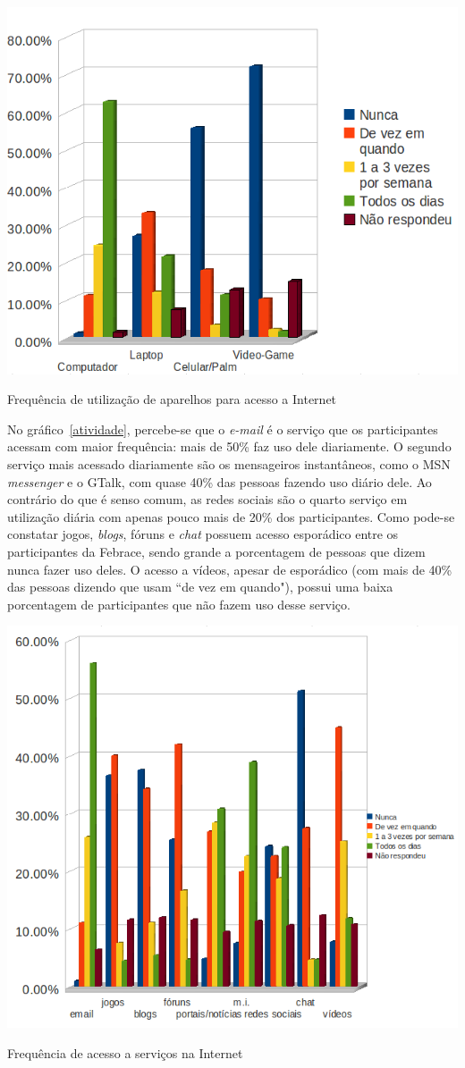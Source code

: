     \begin{grafico}
        \begin{center}
    \includegraphics[width=0.7\linewidth]{arquivos/dispositivo.png}
        \end{center}
        \caption{Frequência de utilização de aparelhos para acesso a Internet}
        \label{dispositivo}
    \end{grafico}

    No gráfico~\ref{atividade}, percebe-se que o \textit{e-mail} é o serviço que os participantes acessam com maior frequência: mais de 50\% faz uso dele diariamente. O segundo serviço mais acessado diariamente são os mensageiros instantâneos, como o MSN \textit{messenger} e o GTalk, com quase 40\%  das pessoas fazendo uso diário dele. Ao contrário do que é senso comum, as redes sociais são o quarto serviço em utilização diária com apenas pouco mais de 20\% dos participantes. Como pode-se constatar jogos, \textit{blogs}, fóruns e \textit{chat} possuem acesso esporádico entre os participantes da Febrace, sendo grande a porcentagem de pessoas que dizem nunca fazer uso deles. O acesso a vídeos, apesar de esporádico (com mais de 40\% das pessoas dizendo que usam “de vez em quando"), possui uma baixa porcentagem de participantes que não fazem uso desse serviço.

    \begin{grafico}
        \begin{center}
    \includegraphics[width=0.7\linewidth]{arquivos/atividade.png}
        \end{center}
        \caption{Frequência de acesso a serviços na Internet}
        \label{atividade}
    \end{grafico}

